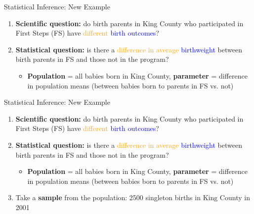 \documentclass[10pt,t]{beamer}
\begin{document}
\begin{frame}{Statistical Inference: New Example}

\begin{enumerate}
	\item \textbf{Scientific question:} do birth parents in King County who participated in First Steps (FS) have \textcolor{orange}{different} \textcolor{blue}{birth outcomes}?
	\item \textbf{Statistical question:} is there a \textcolor{orange}{difference in average} \textcolor{blue}{birthweight} between birth parents in FS and those not in the program?
	\begin{itemize}
		\item \textbf{Population} = all babies born in King County, \textbf{parameter} = difference in population means (between babies born to parents in FS vs. not)
	\end{itemize}
\end{enumerate}

\end{frame}

\begin{frame}{Statistical Inference: New Example}

\begin{enumerate}
	\item \textbf{Scientific question:} do birth parents in King County who participated in First Steps (FS) have \textcolor{orange}{different} \textcolor{blue}{birth outcomes}?
	\item \textbf{Statistical question:} is there a \textcolor{orange}{difference in average} \textcolor{blue}{birthweight} between birth parents in FS and those not in the program?
	\begin{itemize}
		\item \textbf{Population} = all babies born in King County, \textbf{parameter} = difference in population means (between babies born to parents in FS vs. not)
	\end{itemize}
	\item Take a \textbf{sample} from the population: 2500 singleton births in King County in 2001
\end{enumerate}

\end{frame}
\end{document}
